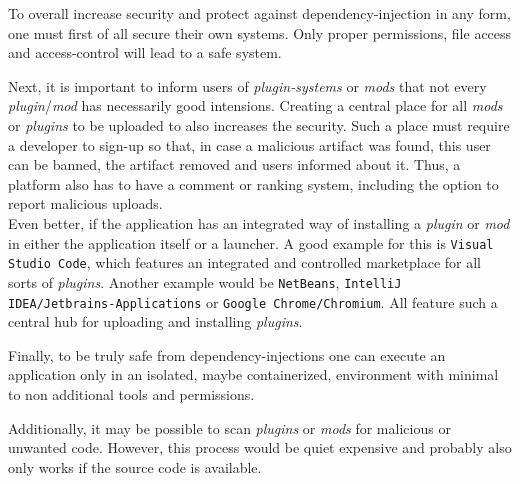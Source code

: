 To overall increase security and protect against dependency-injection in any form, one must first of all secure their own systems.
Only proper permissions, file access and access-control will lead to a safe system.

Next, it is important to inform users of \textit{plugin-systems} or \textit{mods} that not every \textit{plugin}/\textit{mod} has necessarily good intensions.
Creating a central place for all \textit{mods} or \textit{plugins} to be uploaded to also increases the security.
Such a place must require a developer to sign-up so that, in case a malicious artifact was found, this user can be banned, the artifact removed and users informed about it.
Thus, a platform also has to have a comment or ranking system, including the option to report malicious uploads.\\
Even better, if the application has an integrated way of installing a \textit{plugin} or \textit{mod} in either the application itself or a launcher.
A good example for this is \texttt{Visual Studio Code}, which features an integrated and controlled marketplace for all sorts of \textit{plugins}.
Another example would be \texttt{NetBeans}, \texttt{IntelliJ IDEA/Jetbrains-Applications} or \texttt{Google Chrome/Chromium}.
All feature such a central hub for uploading and installing \textit{plugins}.

Finally, to be truly safe from dependency-injections one can execute an application only in an isolated, maybe containerized, environment with minimal to non additional tools and permissions.

Additionally, it may be possible to scan \textit{plugins} or \textit{mods} for malicious or unwanted code.
However, this process would be quiet expensive and probably also only works if the source code is available.